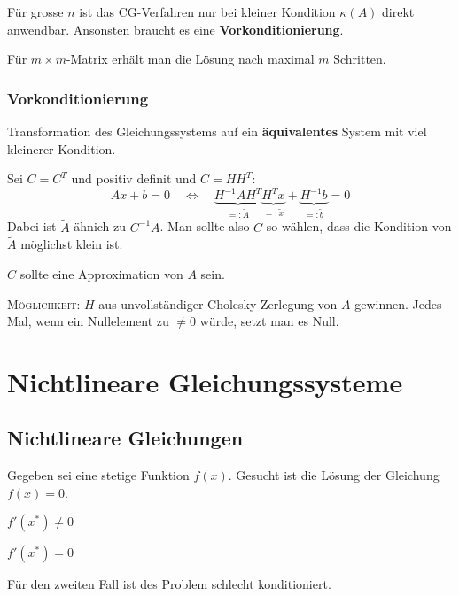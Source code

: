 			Für grosse $n$ ist das CG-Verfahren nur bei kleiner Kondition $\kappa(A)$ direkt anwendbar. Ansonsten braucht es eine \textbf{Vorkonditionierung}.
			
			Für $m \times m$-Matrix erhält man die Lösung nach maximal $m$ Schritten.
			
		\subsubsection{Vorkonditionierung}
			Transformation des Gleichungssystems auf ein \textbf{äquivalentes} System mit viel kleinerer Kondition.
			
			Sei $C=C^T$ und positiv definit und $C=H H^T$:
			\[
				Ax + b = 0 \quad\Leftrightarrow\quad \underbrace{H^{-1}AH^T}_{=: \tilde A} \underbrace{H^Tx}_{=: \tilde x} + \underbrace{H^{-1}b}_{=: \tilde b} = 0\]
			Dabei ist $\tilde A$ ähnich zu $C^{-1}A$. Man sollte also $C$ so wählen, dass die Kondition von $\tilde A$ möglichst klein ist. \\
			
			\begin{folgerung}
				$C$ sollte eine Approximation von $A$ sein.
			\end{folgerung}
			
			\textsc{Möglichkeit:} $H$ aus unvollständiger Cholesky-Zerlegung von $A$ gewinnen. Jedes Mal, wenn ein Nullelement zu $\neq 0$ würde, setzt man es Null.

\section{Nichtlineare Gleichungssysteme} 
	\subsection{Nichtlineare Gleichungen}
		Gegeben sei eine stetige Funktion $f(x)$. Gesucht ist die Lösung der Gleichung $f(x)=0$. 
		\begin{tightenumerate}
			\item $f'(x^*)\not= 0$ 
			\item $f'(x^*) = 0 $ 
		\end{tightenumerate}
		Für den zweiten Fall ist des Problem schlecht konditioniert.

